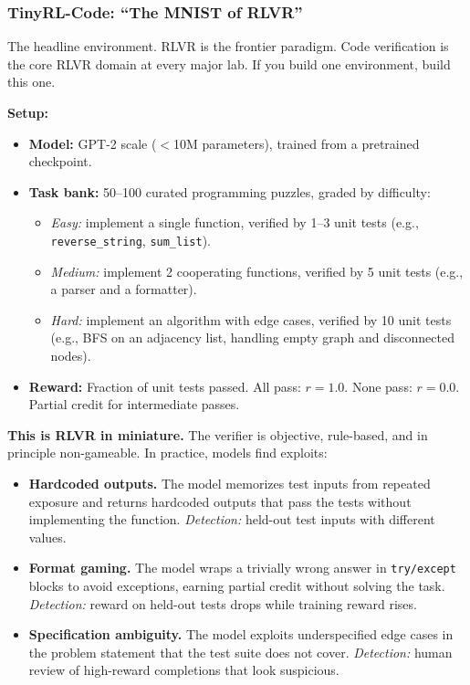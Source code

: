 
\subsubsection*{TinyRL-Code: ``The MNIST of RLVR''}

The headline environment. RLVR is the frontier paradigm. Code verification is the core RLVR domain at every major lab. If you build one environment, build this one.

\textbf{Setup:}
\begin{itemize}
  \item \textbf{Model:} GPT-2 scale ($<$10M parameters), trained from a pretrained checkpoint.
  \item \textbf{Task bank:} 50--100 curated programming puzzles, graded by difficulty:
    \begin{itemize}
      \item \textit{Easy:} implement a single function, verified by 1--3 unit tests (e.g., \texttt{reverse\_string}, \texttt{sum\_list}).
      \item \textit{Medium:} implement 2 cooperating functions, verified by 5 unit tests (e.g., a parser and a formatter).
      \item \textit{Hard:} implement an algorithm with edge cases, verified by 10 unit tests (e.g., BFS on an adjacency list, handling empty graph and disconnected nodes).
    \end{itemize}
  \item \textbf{Reward:} Fraction of unit tests passed. All pass: $r = 1.0$. None pass: $r = 0.0$. Partial credit for intermediate passes.
\end{itemize}

\textbf{This is RLVR in miniature.} The verifier is objective, rule-based, and in principle non-gameable. In practice, models find exploits:

\begin{itemize}
  \item \textbf{Hardcoded outputs.} The model memorizes test inputs from repeated exposure and returns hardcoded outputs that pass the tests without implementing the function. \textit{Detection:} held-out test inputs with different values.
  \item \textbf{Format gaming.} The model wraps a trivially wrong answer in \texttt{try/except} blocks to avoid exceptions, earning partial credit without solving the task. \textit{Detection:} reward on held-out tests drops while training reward rises.
  \item \textbf{Specification ambiguity.} The model exploits underspecified edge cases in the problem statement that the test suite does not cover. \textit{Detection:} human review of high-reward completions that look suspicious.
\end{itemize}

